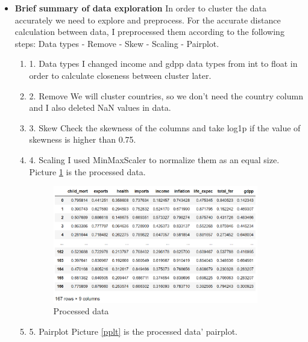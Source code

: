 \documentclass[12pt]{article}
\begin{document}
\begin{itemize}
\item \textbf{Brief summary of data exploration}
In order to cluster the data accurately we need to explore and preprocess. For the accurate distance calculation between data, I preprocessed them according to the following steps: Data types - Remove - Skew - Scaling - Pairplot.
  \begin{enumerate}
    \item 1. Data types 
      I changed income and gdpp data types from int to float in order to calculate closeness between cluster later.
    \item 2. Remove
      We will cluster countries, so we don't need the country column and I also deleted NaN values in data.
    \item 3. Skew 
      Check the skewness of the columns and take log1p if the value of skewness is higher than 0.75.
    \item 4. Scaling
      I used MinMaxScaler to normalize them as an equal size. Picture \ref{datap} is the processed data.
      \begin{figure}[H]
        \centering
        \includegraphics[width=0.9\textwidth]{figures/datap.png}
        \caption{Processed data}\label{datap}
      \end{figure}
    \item 5. Pairplot
      Picture \ref{pplt} is the processed data' pairplot.
      \begin{figure}[H]
        \centering

\end{figure}
\end{enumerate}
\end{itemize}
\end{document}
